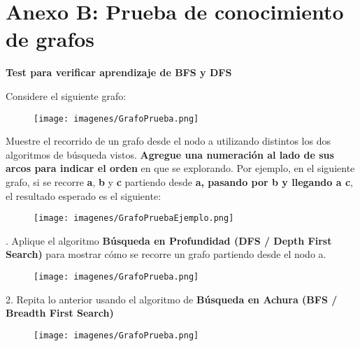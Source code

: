 
\chapter{Anexo B: Prueba de conocimiento de grafos} \label{AnexoB}
\textbf{Test para verificar aprendizaje de BFS y DFS}

Considere el siguiente grafo:

\begin{figure}[h]
        \centering
    \texttt{[image: imagenes/GrafoPrueba.png]}
\end{figure}

Muestre el recorrido de un grafo desde el nodo a utilizando distintos los dos algoritmos de búsqueda vistos. \textbf{Agregue una numeración al lado de sus arcos para indicar el orden} en que se explorando.
Por ejemplo, en el siguiente grafo, si se recorre \textbf{a}, \textbf{b} y \textbf{c} partiendo desde \textbf{a, pasando por b y llegando a c}, el resultado esperado es el siguiente:

\begin{figure}[h]
        \centering
        \texttt{[image: imagenes/GrafoPruebaEjemplo.png]}
\end{figure}

.	Aplique el algoritmo \textbf{Búsqueda en Profundidad (DFS / Depth First Search)} para mostrar cómo se recorre un grafo partiendo desde el nodo a.

\begin{figure}[htbp]
        \centering
    \texttt{[image: imagenes/GrafoPrueba.png]}
\end{figure}

2.	Repita lo anterior usando el algoritmo de \textbf{Búsqueda en Achura (BFS / Breadth First Search)}

\begin{figure}[htbp]
        \centering
    \texttt{[image: imagenes/GrafoPrueba.png]}
\end{figure}

